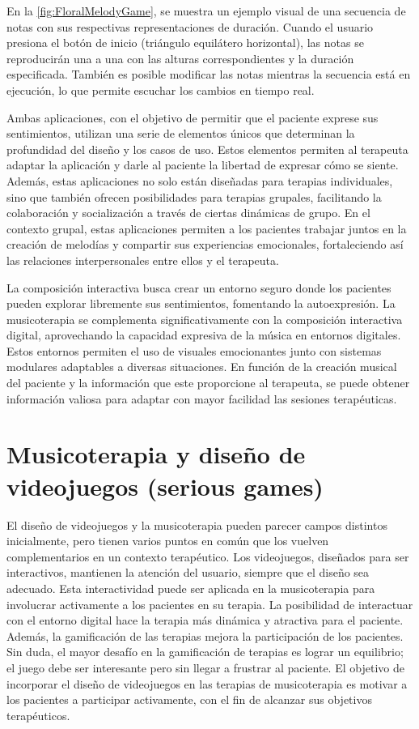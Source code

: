 En la \autoref{fig:FloralMelodyGame}, se muestra un ejemplo visual de una secuencia de notas con sus respectivas representaciones de duración. Cuando el usuario presiona el botón de inicio (triángulo equilátero horizontal), las notas se reproducirán una a una con las alturas correspondientes y la duración especificada. También es posible modificar las notas mientras la secuencia está en ejecución, lo que permite escuchar los cambios en tiempo real.

Ambas aplicaciones, con el objetivo de permitir que el paciente exprese sus sentimientos, utilizan una serie de elementos únicos que determinan la profundidad del diseño y los casos de uso. Estos elementos permiten al terapeuta adaptar la aplicación y darle al paciente la libertad de expresar cómo se siente. Además, estas aplicaciones no solo están diseñadas para terapias individuales, sino que también ofrecen posibilidades para terapias grupales, facilitando la colaboración y socialización a través de ciertas dinámicas de grupo. En el contexto grupal, estas aplicaciones permiten a los pacientes trabajar juntos en la creación de melodías y compartir sus experiencias emocionales, fortaleciendo así las relaciones interpersonales entre ellos y el terapeuta.

La composición interactiva busca crear un entorno seguro donde los pacientes pueden explorar libremente sus sentimientos, fomentando la autoexpresión. La musicoterapia se complementa significativamente con la composición interactiva digital, aprovechando la capacidad expresiva de la música en entornos digitales. Estos entornos permiten el uso de visuales emocionantes junto con sistemas modulares adaptables a diversas situaciones. En función de la creación musical del paciente y la información que este proporcione al terapeuta, se puede obtener información valiosa para adaptar con mayor facilidad las sesiones terapéuticas.

\section{Musicoterapia y diseño de videojuegos (serious games)}

El diseño de videojuegos y la musicoterapia pueden parecer campos distintos inicialmente, pero tienen varios puntos en común que los vuelven complementarios en un contexto terapéutico. Los videojuegos, diseñados para ser interactivos, mantienen la atención del usuario, siempre que el diseño sea adecuado. Esta interactividad puede ser aplicada en la musicoterapia para involucrar activamente a los pacientes en su terapia. La posibilidad de interactuar con el entorno digital hace la terapia más dinámica y atractiva para el paciente. Además, la gamificación de las terapias mejora la participación de los pacientes. Sin duda, el mayor desafío en la gamificación de terapias es lograr un equilibrio; el juego debe ser interesante pero sin llegar a frustrar al paciente. El objetivo de incorporar el diseño de videojuegos en las terapias de musicoterapia es motivar a los pacientes a participar activamente, con el fin de alcanzar sus objetivos terapéuticos.

